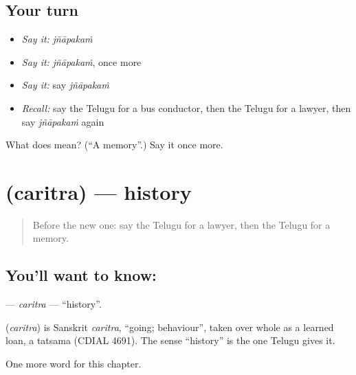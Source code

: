 \subsection*{Your turn}
\begin{itemize}
\raggedright
  \item \emph{Say it:} \emph{jñāpakaṁ}
  \item \emph{Say it:} \emph{jñāpakaṁ}, once more
  \item \emph{Say it:} say \emph{jñāpakaṁ}
  \item \emph{Recall:} say the Telugu for a bus conductor, then the Telugu for a lawyer, then say \emph{jñāpakaṁ} again
\end{itemize}

\begin{tcolorbox}[breakable,colback=teal!4,colframe=teal!35!black,title={Before you move on}]
What does  mean? (\textquotedblleft{}A memory\textquotedblright{}.) Say it once more.
\end{tcolorbox}
\section[\texorpdfstring{\te{చరిత్ర} (caritra)}{చరిత్ర (caritra)}]{ (caritra) — history}

\label{lesson:TE-C238-caritra}



\begin{quote}
Before the new one: say the Telugu for a lawyer, then the Telugu for a memory.
\end{quote}

\subsection*{You'll want to know: }
\textbf{} — \emph{caritra} — \textquotedblleft{}history\textquotedblright{}.

\begin{cousinweb}
\textbf{} (\emph{caritra}) is Sanskrit \emph{caritra}, \textquotedblleft{}going; behaviour\textquotedblright{}, taken over whole as a learned loan, a tatsama (CDIAL 4691). The sense \textquotedblleft{}history\textquotedblright{} is the one Telugu gives it.
\end{cousinweb}

\begin{grammarlens}[title={What you've built}]
One more word for this chapter.
\end{grammarlens}

